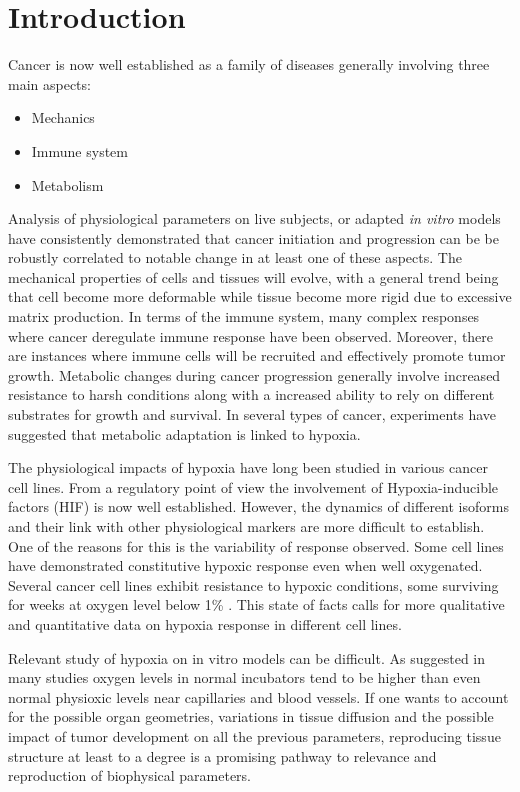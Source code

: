 \documentclass[11pt,a4paper]{article}
\begin{document}
\section{Introduction}
Cancer is now well established as a family of diseases generally involving three main aspects: 
\begin{itemize}
\item Mechanics 
\item Immune system
\item Metabolism 
\end{itemize}
Analysis of physiological parameters on live subjects, or adapted \textit{in vitro} models have consistently demonstrated that cancer initiation and progression can be be robustly correlated to notable change in at least one of these aspects. The mechanical properties of cells and tissues will evolve, with a general trend being that cell become more deformable while tissue become more rigid due to excessive matrix production. In terms of the immune system, many complex responses where cancer deregulate immune response have been observed. Moreover, there are instances where immune cells will be recruited and effectively promote tumor growth. Metabolic changes during cancer progression generally involve increased resistance to harsh conditions along with a increased ability to rely on different substrates for growth and survival. In several types of cancer, experiments have suggested that metabolic adaptation is linked to hypoxia.

The physiological impacts of hypoxia have long been studied in various cancer cell lines. From a regulatory point of view the involvement of Hypoxia-inducible factors (HIF) is now well established. However, the dynamics of different isoforms and their link with other physiological markers are more difficult to establish. One of the reasons for this is the variability of response observed. Some cell lines have demonstrated constitutive hypoxic response even when well oxygenated. Several cancer cell lines exhibit resistance to hypoxic conditions, some surviving for weeks at oxygen level below 1\% \cite{McKeown2014}. This state of facts calls for more qualitative and quantitative data on hypoxia response in different cell lines.

Relevant study of hypoxia on in vitro models can be difficult. As suggested in many studies oxygen levels in normal incubators tend to be higher than even normal physioxic levels near capillaries and blood vessels. If one wants to account for the possible organ geometries, variations in tissue diffusion and the possible impact of tumor development on all the previous parameters, reproducing tissue structure at least to a degree is a promising pathway to relevance and reproduction of biophysical parameters.
\end{document}

